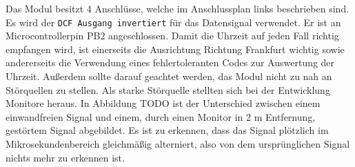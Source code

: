%
\begin{figure}
  \vspace{-25pt}
  \begin{center}
  \end{center}
  \vspace{-20pt}
\end{figure}
%
Das Modul besitzt 4 Anschlüsse, welche im Anschlussplan links beschrieben sind. Es wird der \texttt{DCF Ausgang invertiert} für das Datensignal verwendet. Er ist an Microcontrollerpin PB2 angeschlossen. Damit die Uhrzeit auf jeden Fall richtig empfangen wird, ist einerseits die Ausrichtung Richtung Frankfurt wichtig sowie andererseits die Verwendung eines fehlertoleranten Codes zur Auswertung der Uhrzeit. Außerdem sollte darauf geachtet werden, das Modul nicht zu nah an Störquellen zu stellen. Als starke Störquelle stellten sich bei der Entwicklung Monitore heraus. In Abbildung TODO ist der Unterschied zwischen einem einwandfreien Signal und einem, durch einen Monitor in 2 m Entfernung, gestörtem Signal abgebildet. Es ist zu erkennen, dass das Signal plötzlich im Mikrosekundenbereich gleichmäßig alterniert, also von dem ursprünglichen Signal nichts mehr zu erkennen ist.

